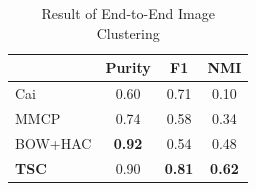 
\begin{table}[th]
\centering
\caption{Result of End-to-End Image Clustering}
\small
\begin{tabular}{|l|c|c|c|}
\hline
           &  Purity &    F1 &   NMI  \\
\hline
  Cai &      0.60  &      0.71  &      0.10   \\
\hline
 MMCP &      0.74  &      0.58  &      0.34   \\
\hline
 BOW+HAC &     {\bf 0.92}  &      0.54  &      0.48   \\
\hline
{\bf TSC} &      0.90  &    {\bf 0.81}  &    {\bf 0.62}   \\
\hline
\end{tabular}
\label{tab:end2end}
\end{table}

